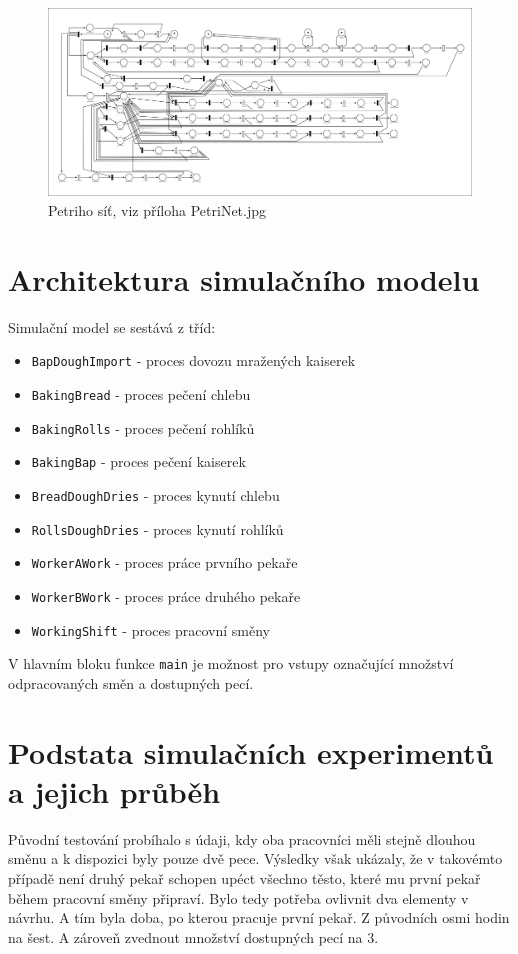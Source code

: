 \documentclass[11pt]{article}
\begin{document}
\begin{figure}[H]
  \includegraphics[width=\linewidth]{PetriNet.jpg}
  \caption{Petriho síť, viz příloha PetriNet.jpg}
  \label{fig:petrinet}
\end{figure}


\section{Architektura simulačního modelu}
Simulační model se sestává z tříd:
\begin{itemize}  
\item \verb|BapDoughImport| - proces dovozu mražených kaiserek
\item \verb|BakingBread| - proces pečení chlebu
\item \verb|BakingRolls| - proces pečení rohlíků
\item \verb|BakingBap| - proces pečení kaiserek
\item \verb|BreadDoughDries| - proces kynutí chlebu
\item \verb|RollsDoughDries| - proces kynutí rohlíků
\item \verb|WorkerAWork| - proces práce prvního pekaře
\item \verb|WorkerBWork| - proces práce druhého pekaře
\item \verb|WorkingShift| - proces pracovní směny
\end{itemize}

V hlavním bloku funkce \verb|main| je možnost pro vstupy označující množství odpracovaných směn a dostupných pecí. 


\section{Podstata simulačních experimentů a jejich průběh}
Původní testování probíhalo s údaji, kdy oba pracovníci měli stejně dlouhou směnu a k dispozici byly pouze dvě pece. Výsledky však ukázaly, že v takovémto případě není druhý pekař schopen upéct všechno těsto, které mu první pekař během pracovní směny připraví. Bylo tedy potřeba ovlivnit dva elementy v návrhu. A tím byla doba, po kterou pracuje první pekař. Z původních osmi hodin na šest. A zároveň zvednout množství dostupných pecí na 3. 
\end{document}
